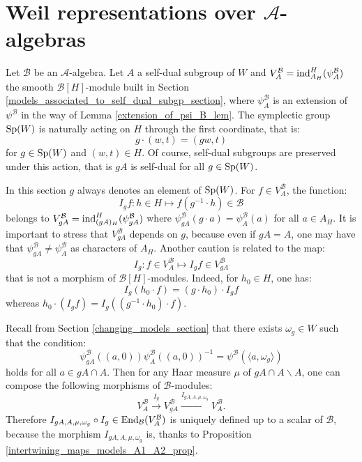\documentclass[11pt]{article}
\theoremstyle{plain}
\theoremstyle{definition}
\theoremstyle{plain}
\theoremstyle{definition}
\theoremstyle{plain}
\begin{document}
\section{Weil representations over $\mathcal{A}$-algebras} \label{weil_over_A_algebra_section}

Let $\mathcal{B}$ be an $\mathcal{A}$-algebra. Let $A$ a self-dual subgroup of $W$ and $V_A^\mathcal{B}=\textup{ind}_{A_H}^H(\psi_A^\mathcal{B})$ the smooth $\mathcal{B}[H]$-module built in Section \ref{models_associated_to_self_dual_subgp_section}, where $\psi_A^\mathcal{B}$ is an extension of $\psi^\mathcal{B}$ in the way of Lemma \ref{extension_of_psi_B_lem}. The symplectic group $\textup{Sp}(W)$ is naturally acting on $H$ through the first coordinate, that is:
$$g \cdot (w,t) = (g w ,t)$$
for $g \in \textup{Sp}(W)$ and $(w,t) \in H$. Of course, self-dual subgroups are preserved under this action, that is $gA$ is self-dual for all $g \in \textup{Sp}(W)$.

In this section $g$ always denotes an element of $\textup{Sp}(W)$. For $f \in V_A^\mathcal{B}$, the function:
$$I_gf : h \in H \mapsto f(g^{-1} \cdot h) \in \mathcal{B}$$
belongs to $V_{gA}^\mathcal{B} = \textup{ind}_{(gA)_H}^H(\psi_{gA}^\mathcal{B})$ where $\psi_{gA}^\mathcal{B}(g \cdot a ) = \psi_A^\mathcal{B}(a)$ for all $a \in A_H$. It is important to stress that $V_{gA}^\mathcal{B}$ depends on $g$, because even if $gA = A$, one may have that $\psi_{gA}^\mathcal{B} \neq \psi_{A}^\mathcal{B}$ as characters of $A_H$. Another caution is related to the map:
$$I_g : f \in V_A^\mathcal{B} \mapsto I_g f \in V_{gA}^\mathcal{B}$$
that is not a morphism of $\mathcal{B}[H]$-modules. Indeed, for $h_0 \in H$, one has:
$$I_g(h_0 \cdot f ) = (g \cdot h_0)\cdot I_g f$$
whereas $h_0 \cdot (I_g f) = I_g((g^{-1} \cdot h_0) \cdot f)$.

Recall from Section \ref{changing_models_section} that there exists $\omega_g \in W$ such that the condition:
$$\psi_{gA}^\mathcal{B} ((a,0)) \psi_{A}^\mathcal{B} ((a,0))^{-1} = \psi^\mathcal{B}( \langle a, \omega_g \rangle)$$
holds for all $a \in g A \cap A$. Then for any Haar measure $\mu$ of $gA \cap A \backslash A$, one can compose the following morphisms of $\mathcal{B}$-modules:
$$V_A^\mathcal{B} \overset{I_g}{\longrightarrow} V_{gA}^\mathcal{B} \overset{I_{gA,A,\mu,\omega_g}}{\longrightarrow} V_{A}^\mathcal{B}.$$
Therefore $I_{gA,A,\mu,\omega_g} \circ I_g \in \textup{End}_\mathcal{B} (V_A^\mathcal{B})$ is uniquely defined up to a scalar of $\mathcal{B}$, because the morphism $I_{gA,A,\mu,\omega_g}$ is, thanks to Proposition \ref{intertwining_maps_models_A1_A2_prop}.
\end{document}
